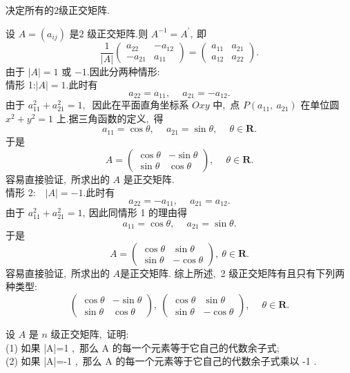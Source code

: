 \newpage
\begin{problem}
	决定所有的$ 2 $级正交矩阵.
\end{problem}
\begin{solution}
	设  $A=\left(a_{i j}\right) $ 是$ 2$ 级正交矩阵.则 $ A^{-1}=A^{\prime} ,\ $即
	$$\frac{1}{|A|}\left(\begin{array}{rc}
		a_{22} & -a_{12} \\
		-a_{21} & a_{11}
	\end{array}\right)=\left(\begin{array}{ll}
		a_{11} & a_{21} \\
		a_{12} & a_{22}
	\end{array}\right) .$$
	由于 $ |A|=1 $ 或 $ -1 .$因此分两种情形:\\
	情形 1:$|A|=1 .$此时有
	$$a_{22}=a_{11},\  \quad a_{21}=-a_{12} .$$
	由于 $ a_{11}^{2}+a_{21}^{2}=1 ,\ $ 因此在平面直角坐标系  $O x y $ 中,\  点  $P\left(a_{11},\  a_{21}\right) $ 在单位圆 $ x^{2}+y^{2}=1 $ 上.据三角函数的定义,\  得
	$$a_{11}=\cos \theta,\  \quad a_{21}=\sin \theta,\  \quad \theta \in \mathbf{R} .$$
	于是
	$$A=\left(\begin{array}{rr}
		\cos \theta & -\sin \theta \\
		\sin \theta & \cos \theta
	\end{array}\right),\  \quad \theta \in \mathbf{R} .$$
	容易直接验证,\ 所求出的  $A $ 是正交矩阵.\\
	情形 2:$ \quad|A|=-1.$此时有
	$$a_{22}=-a_{11},\  \quad a_{21}=a_{12} .$$
	由于 $ a_{11}^{2}+a_{21}^{2}=1 ,\  $因此同情形 1 的理由得
	$$a_{11}=\cos \theta,\  \quad a_{21}=\sin \theta .$$
	于是
	$$A=\left(\begin{array}{cr}
		\cos \theta & \sin \theta \\
		\sin \theta & -\cos \theta
	\end{array}\right),\  \theta \in \mathbf{R} .$$
	容易直接验证,\ 所求出的 $ A  $是正交矩阵.
	综上所述,\  2 级正交矩阵有且只有下列两种类型:
	$$\left(\begin{array}{rr}
		\cos \theta & -\sin \theta \\
		\sin \theta & \cos \theta
	\end{array}\right),\ \left(\begin{array}{rr}
		\cos \theta & \sin \theta \\
		\sin \theta & -\cos \theta
	\end{array}\right),\  \quad \theta \in \mathbf{R} .$$
\end{solution}
\newpage
\begin{problem}
	设 $ A $ 是 $ n$  级正交矩阵,\ 证明:\\
	(1) 如果  |A|=1 ,\  那么  A  的每一个元素等于它自己的代数余子式;\\
	(2) 如果  |A|=-1 ,\  那么  A  的每一个元素等于它自己的代数余子式乘以  -1 .\\
\end{problem}
